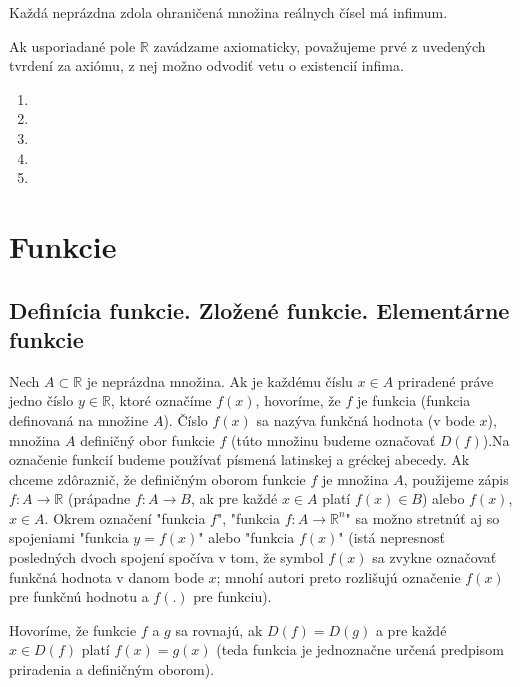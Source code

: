 \begin{veta}
Každá neprázdna zdola ohraničená množina reálnych čísel má infimum.
\end{veta}

Ak usporiadané pole $\mathbb{R}$ zavádzame axiomaticky, považujeme prvé z
uvedených tvrdení za axiómu, z nej možno odvodiť vetu o existencií infima.

\showanswers
\begin{enumerate}[resume]
  \item {}
  \hideanswers
  \item {}
  \item {}
  \item {}
  \item {}
\end{enumerate}

\section{Funkcie}
\subsection{Definícia funkcie. Zložené funkcie. Elementárne funkcie}
Nech $A\subset \mathbb{R}$ je neprázdna množina. Ak je každému číslu $x\in A$ priradené práve jedno číslo $y\in\mathbb{R}$, ktoré označíme $f(x)$, hovoríme, že $f$ je funkcia (funkcia definovaná na množine $A$). Číslo $f(x)$ sa nazýva funkčná hodnota (v bode $x$), množina $A$ definičný obor funkcie $f$ (túto množinu budeme označovať $D(f)$).Na označenie funkcií budeme používať písmená latinskej a gréckej abecedy. Ak chceme zdôraznič, že definičným oborom funkcie $f$ je množina $A$, použijeme zápis $f:A \rightarrow \mathbb{R}$ (prápadne $f:A \rightarrow B$, ak pre každé $x\in A$ platí $f(x)\in B$) alebo $f(x)$, $x\in A$. Okrem označení "funkcia $f$", "funkcia $f:A \rightarrow \mathbb{R}^n$" sa možno stretnúť aj so spojeniami "funkcia $y=f(x)$" alebo "funkcia $f(x)$" (istá nepresnosť posledných dvoch spojení spočíva v tom, že symbol $f(x)$ sa zvykne označovať funkčná hodnota v danom bode $x$; mnohí autori preto rozlišujú označenie $f(x)$ pre funkčnú hodnotu a $f(.)$ pre funkciu).

Hovoríme, že funkcie $f$ a $g$ sa rovnajú, ak $D(f)=D(g)$ a pre každé $x\in D(f)$ platí $f(x)=g(x)$ (teda funkcia je jednoznačne určená predpisom priradenia a definičným oborom). 

